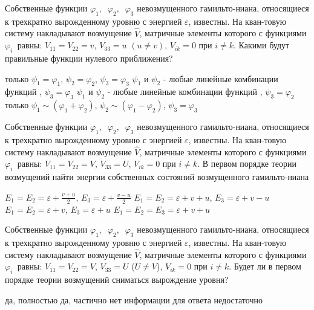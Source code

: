 \documentclass[11pt,a4paper]{exam}
\begin{document}
\begin{questions}
\question Собственные функции ${\varphi _1},\;\;{\varphi _2},\;\;{\varphi _3}$ невозмущенного гамильто-ниана, относящиеся к трехкратно вырожденному уровню с энергией $\varepsilon $, известны. На кван-товую систему накладывают возмущение $\hat V$, матричные элементы которого с функциями ${\varphi _{i\;}}$ равны: ${V_{11}} = {V_{22}} = v$, ${V_{33}} = u$ $(u \ne v)$, ${V_{ik}} = 0$ при $i \ne k$. Какими будут правильные функции нулевого приближения?
\begin{choices}
\choice только ${\psi _1} = {\varphi _1}$, ${\psi _2} = {\varphi _2}$, ${\psi _3} = {\varphi _3}$
\choice ${\psi _1}$ и ${\psi _2}$ - любые линейные комбинации функций , ${\psi _3} = {\varphi _3}$
\choice ${\psi _1}$ и ${\psi _2}$ - любые линейные комбинации функций , ${\psi _3} = {\varphi _2}$
\choice только ${\psi _1} \sim \left( {{\varphi _1} + {\varphi _2}} \right)$, ${\psi _2} \sim \left( {{\varphi _1} - {\varphi _2}} \right)$, ${\psi _3} = {\varphi _3}$
\end{choices}

\question Собственные функции ${\varphi _1},\;\;{\varphi _2},\;\;{\varphi _3}$ невозмущенного гамильто-ниана, относящиеся к трехкратно вырожденному уровню с энергией $\varepsilon $, известны. На кван-товую систему накладывают возмущение $\hat V$, матричные элементы которого с функциями ${\varphi _{i\;}}$ равны: ${V_{11}} = {V_{22}} = V$, ${V_{33}} = U$, ${V_{ik}} = 0$ при $i \ne k$. В первом порядке теории возмущений найти энергии собственных состояний возмущенного гамильто-ниана
\begin{choices}
\choice ${E_1} = {E_2} = \varepsilon  + \frac{{v + u}}{2}$, ${E_3} = \varepsilon  + \frac{{v - u}}{2}$  
\choice ${E_1} = {E_2} = \varepsilon  + v + u$, ${E_3} = \varepsilon  + v - u$
\choice ${E_1} = {E_2} = \varepsilon  + v$, ${E_3} = \varepsilon  + u$       
\choice ${E_1} = {E_2} = {E_3} = \varepsilon  + v + u$
\end{choices}

\question Собственные функции ${\varphi _1},\;\;{\varphi _2},\;\;{\varphi _3}$ невозмущенного гамильто-ниана, относящиеся к трехкратно вырожденному уровню с энергией $\varepsilon $, известны. На кван-товую систему накладывают возмущение $\hat V$, матричные элементы которого с функциями ${\varphi _{i\;}}$ равны: ${V_{11}} = {V_{22}} = V$, ${V_{33}} = U$ ($U \ne V$), ${V_{ik}} = 0$ при $i \ne k$. Будет ли в первом порядке теории возмущений сниматься вырождение уровня?
\begin{choices}
\choice да, полностью  
\choice да, частично   
\choice нет      
\choice информации для ответа недостаточно
\end{choices}


\end{questions}
\end{document}
